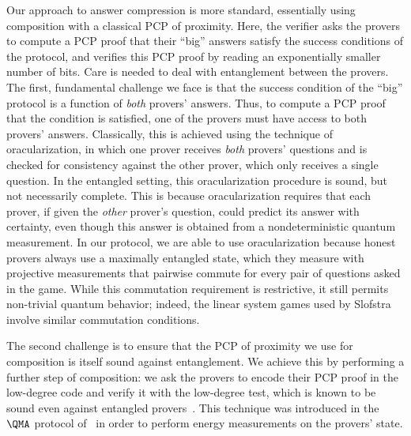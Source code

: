 \documentclass[11pt]{article}
\begin{document}
Our approach to answer compression is more standard, essentially using composition with a
classical PCP of proximity. Here, the verifier asks the provers
to compute a PCP proof that their ``big'' answers satisfy the success
conditions of the protocol, and verifies this PCP proof by reading an
exponentially smaller number of bits. Care is needed to deal
with entanglement between the provers. The first, fundamental
challenge we face is that the success condition of the ``big''
protocol is a function of \emph{both} provers' answers. Thus, to
compute a PCP proof that the condition is satisfied, one of the
provers must have access to both provers' answers. Classically, this
is achieved using the technique of oracularization, in which one prover
receives \emph{both} provers' questions and is checked for consistency
against the other prover, which only receives a single question. In
the entangled setting, this oracularization procedure is sound, but not
necessarily complete. This is because oracularization requires that each prover, if given the
\emph{other} prover's question, could predict its answer with
certainty, even though this answer is obtained from a nondeterministic
quantum measurement. In our protocol, we are able to use
oracularization because honest provers always use
a maximally entangled state, which they measure with projective
measurements that pairwise commute for every pair of questions asked
in the game. While this commutation requirement is restrictive, it
still permits non-trivial quantum behavior; indeed, the linear system games used by Slofstra~\cite{Slo19}
involve similar commutation conditions.


The second challenge is to ensure that the PCP of proximity we use for
composition is itself sound against entanglement. We achieve this by
performing a further step of composition: we ask the provers to encode
their PCP proof in the low-degree code and verify it with the
low-degree test, which is known to be sound even against entangled
provers~\cite{NV18b}. This technique was introduced in the $\QMA$
protocol of~\cite{NV18a} in
order to perform energy measurements on the provers' state.
\end{document}
